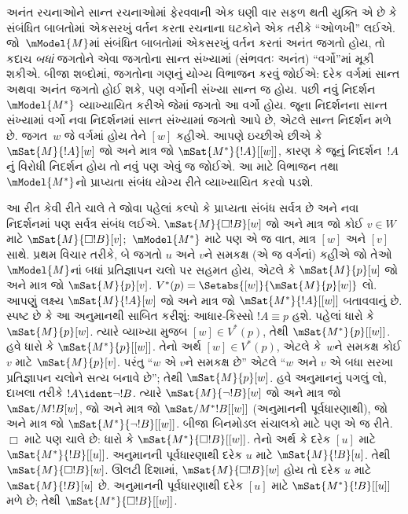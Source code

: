 અનંત રચનાઓને સાન્ત રચનાઓમાં ફેરવવાની એક ઘણી વાર સફળ થતી
યુક્તિ એ છે કે સંબંધિત બાબતોમાં એકસરખું વર્તન કરતા રચનાના
ઘટકોને એક તરીકે ``ઓળખી'' લઈએ. જો~$\mModel{M}$માં
સંબંધિત બાબતોમાં એકસરખું વર્તન કરતાં અનંત જગતો હોય, તો કદાચ
\emph{બધાં} જગતોને એવા જગતોના સાન્ત સંખ્યામાં (સંભવતઃ અનંત)
``વર્ગો''માં મૂકી શકીએ. બીજા શબ્દોમાં, જગતોના ગણનું યોગ્ય
વિભાજન કરવું જોઈએ: દરેક વર્ગમાં સાન્ત અથવા અનંત જગતો હોઈ શકે,
પણ વર્ગોની સંખ્યા સાન્ત જ હોય.
પછી નવું નિદર્શન~$\mModel{M^*}$ વ્યાખ્યાયિત કરીએ જેમાં જગતો
આ વર્ગો હોય. જૂના નિદર્શનના સાન્ત સંખ્યામાં વર્ગો નવા નિદર્શનમાં
સાન્ત સંખ્યામાં જગતો આપે છે, એટલે સાન્ત નિદર્શન મળે છે.
જગત~$w$ જે વર્ગમાં હોય તેને $[w]$ કહીએ. આપણે ઇચ્છીએ છીએ કે
$\mSat{M}{!A}[w]$ જો અને માત્ર જો $\mSat{M^*}{!A}[{[w]}]$,
કારણ કે જૂનું નિદર્શન~$!A$નું વિરોધી નિદર્શન હોય તો નવું પણ
એવું જ જોઈએ. આ માટે વિભાજન તથા~$\mModel{M^*}$નો પ્રાપ્યતા
સંબંધ યોગ્ય રીતે વ્યાખ્યાયિત કરવો પડશે.

આ રીત કેવી રીતે ચાલે તે જોવા પહેલાં કલ્પો કે પ્રાપ્યતા સંબંધ
સર્વત્ર છે અને નવા નિદર્શનમાં પણ સર્વત્ર સંબંધ લઈએ.
$\mSat{M}{\Box !B}[w]$ જો અને માત્ર જો કોઈ
$v \in W$ માટે $\mSat{M}{\Box !B}[v]$;~$\mModel{M^*}$ માટે પણ
એ જ વાત, માત્ર $[w]$ અને $[v]$ સાથે.
પ્રથમ વિચાર તરીકે, બે જગતો $u$ અને $v$ને સમકક્ષ (એ જ વર્ગનાં)
કહીએ જો તેઓ~$\mModel{M}$નાં બધાં પ્રતિજ્ઞાપન ચલો
પર સહમત હોય, એટલે કે $\mSat{M}{p}[u]$ જો અને માત્ર જો
$\mSat{M}{p}[v]$. $V^*(p) = \Setabs{[w]}{\mSat{M}{p}[w]}$ લો.
આપણું લક્ષ્ય $\mSat{M}{!A}[w]$ જો અને માત્ર જો
$\mSat{M^*}{!A}[{[w]}]$ બતાવવાનું છે. સ્પષ્ટ છે કે આ અનુમાનથી
સાબિત કરીશું: આધાર-કિસ્સો $!A \equiv p$ હશે. પહેલાં ધારો કે
$\mSat{M}{p}[w]$. ત્યારે વ્યાખ્યા મુજબ $[w] \in V^*(p)$,
તેથી $\mSat{M^*}{p}[{[w]}]$.
હવે ધારો કે $\mSat{M^*}{p}[{[w]}]$. તેનો અર્થ
$[w] \in V^*(p)$, એટલે કે~$w$ને સમકક્ષ કોઈ $v$ માટે
$\mSat{M}{p}[v]$. પરંતુ ``$w$ એ $v$ને સમકક્ષ છે'' એટલે
``$w$ અને $v$ એ બધા સરખા પ્રતિજ્ઞાપન ચલોને સત્ય
બનાવે છે''; તેથી $\mSat{M}{p}[w]$. હવે અનુમાનનું પગલું લો,
દાખલા તરીકે $!A \ident \lnot !B$. ત્યારે
$\mSat{M}{\lnot !B}[w]$ જો અને માત્ર જો $\mSat/{M}{!B}[w]$,
જો અને માત્ર જો $\mSat/{M^*}{!B}[{[w]}]$ (અનુમાનની
પૂર્વધારણાથી), જો અને માત્ર જો
$\mSat{M^*}{\lnot !B}[{[w]}]$. બીજા બિનમોડલ સંચાલકો માટે પણ
એ જ રીતે. $\Box$ માટે પણ ચાલે છે: ધારો કે
$\mSat{M^*}{\Box !B}[{[w]}]$. તેનો અર્થ કે દરેક $[u]$ માટે
$\mSat{M^*}{!B}[{[u]}]$. અનુમાનની પૂર્વધારણાથી દરેક $u$ માટે
$\mSat{M}{!B}[u]$. તેથી $\mSat{M}{\Box !B}[w]$.
ઊલટી દિશામાં, $\mSat{M}{\Box !B}[w]$ હોય તો દરેક $u$ માટે
$\mSat{M}{!B}[u]$ છે. અનુમાનની પૂર્વધારણાથી દરેક $[u]$ માટે
$\mSat{M^*}{!B}[{[u]}]$ મળે છે; તેથી
$\mSat{M^*}{\Box !B}[{[w]}]$.

